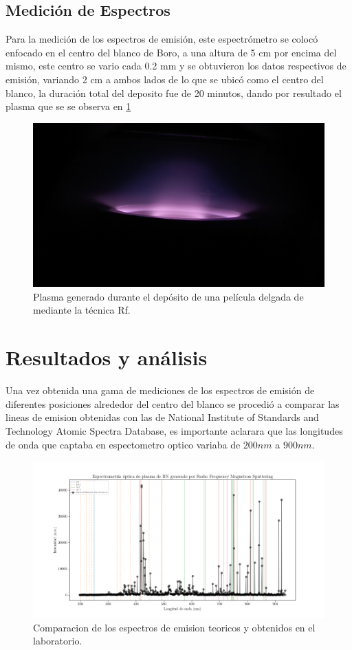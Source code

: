 \documentclass[12pt]{IEEEtran}
\begin{document}
\subsection{Medición de Espectros}

Para la medición de los espectros de emisión, este espectrómetro se colocó enfocado en el centro del blanco de Boro, a una altura de 5 cm por encima del mismo, este centro se vario cada 0.2 mm y se obtuvieron los datos respectivos de emisión, variando 2 cm a ambos lados de lo que se ubicó como el centro del blanco, la duración total del deposito fue de 20 minutos, dando por resultado el plasma que se se observa en \ref{fig:plasma}

\begin{figure}[htp]
	\centering
	\includegraphics[width=0.8\linewidth]{PLASMA.jpg}
	\caption{Plasma generado durante el depósito de una película delgada de  mediante la técnica Rf.}
	\label{fig:plasma}
\end{figure}

\section{Resultados y análisis}

Una vez obtenida una gama de mediciones de los espectros de emisión  de diferentes posiciones alrededor del centro del blanco se procedió a comparar las lineas de emision obtenidas con las de National Institute of Standards and Technology Atomic Spectra Database, es importante aclarara que las longitudes de onda que captaba en espectometro optico variaba de $200 nm $ a $900 nm$.

\begin{figure}[htp]
	\centering
	\includegraphics[width=0.9\linewidth]{figs/longitudes de onda.png}
	\caption{Comparacion de los espectros de emision teoricos y obtenidos en el laboratorio.}
	\label{Graf:plasma}
\end{figure}
\end{document}

